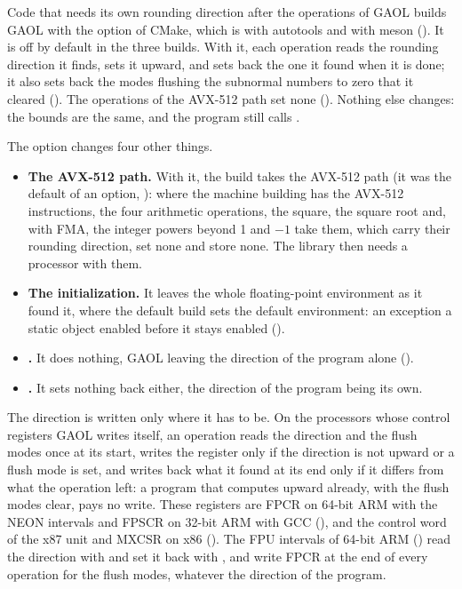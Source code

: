 Code that needs its own rounding direction after the operations of GAOL
builds GAOL with the option  of CMake, which
is  with autotools and
 with meson
(). It is off by default in the three builds. With
it, each operation reads the rounding direction it finds, sets it upward, and
sets back the one it found when it is done; it also sets back the modes
flushing the subnormal numbers to zero that it cleared (). The
operations of the AVX-512 path set none (). Nothing else
changes: the bounds are the same, and the program still calls
.\newinvfive

\medskip
\noindent
The option changes four other things.
\begin{itemize}
\item[$\bullet$] \textbf{The AVX-512 path.} With it, the build takes the
  AVX-512 path (it was the default of an option,
  ): where the machine building has the AVX-512
  instructions, the four arithmetic operations, the square, the square root
  and, with FMA, the integer powers beyond 1 and $-1$ take them, which carry
  their rounding direction, set none and store none. The library then needs a
  processor with them.\newinvfive
\item[$\bullet$] \textbf{The initialization.} It leaves the whole
  floating-point environment as it found it, where the default build sets the
  default environment: an exception a static object enabled before it stays
  enabled ().
\item[$\bullet$] \textbf{.} It does nothing, GAOL
  leaving the direction of the program alone ().
\item[$\bullet$] \textbf{.} It sets nothing back either, the
  direction of the program being its own.
\end{itemize}

\medskip
\noindent
The direction is written only where it has to be. On the processors whose
control registers GAOL writes itself, an operation reads the direction and the
flush modes once at its start, writes the register only if the direction is
not upward or a flush mode is set, and writes back what it found at its end
only if it differs from what the operation left: a program that computes
upward already, with the flush modes clear, pays no write. These registers
are FPCR on 64-bit ARM with the NEON intervals and FPSCR on 32-bit ARM with GCC (),
and the control word of the x87 unit and MXCSR on x86
(). The FPU intervals of 64-bit ARM
() read the direction with  and set
it back with , and write FPCR at the end of every operation
for the flush modes, whatever the direction of the program.

